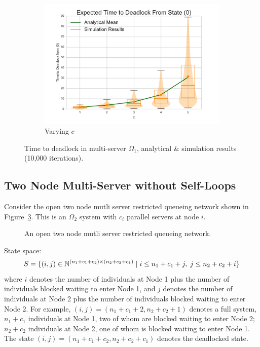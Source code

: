 \documentclass{article}
\begin{document}
\begin{figure}[!htbp]
\begin{center}
\begin{subfigure}[b]{0.35\textwidth}
    \includegraphics[width=\textwidth]{images/varyc_1Nms}
    \caption{Varying $c$}
    \label{fig:1Nms_c}
  \end{subfigure}
  \end{center}
  \caption{Time to deadlock in multi-server $\Omega_1$, analytical \& simulation results (10,000 iterations).}
  \label{fig:timestodeadlock1nodemultiserver}
\end{figure}











\subsection{Two Node Multi-Server without Self-Loops}\label{sec:2nodeMS}

Consider the open two node mutli server restricted queueing network shown in Figure~\ref{fig:queueingnetwork_2nodemulti}.
This is an $\Omega_2$ system with $c_i$ parallel servers at node $i$.

\begin{figure}[!htbp]
  \begin{center}
  
  \end{center}
  \caption{An open two node mutli server restricted queueing network.}
  \label{fig:queueingnetwork_2nodemulti}
\end{figure}

State space:
        \[S = \{(i,j)\in\mathbb{N}^{(n_1+c_1+c_2)\times (n_2+c_2+c_1)} \nonscript\; | \nonscript\; i \leq n_1+c_1+j, \nonscript\; j \leq n_2+c_2+i\}\]
where $i$ denotes the number of individuals at Node 1 plus the number of individuals blocked waiting to enter Node 1, and $j$ denotes the number of individuals at Node 2 plus the number of individuals blocked waiting to enter Node 2.
For example, $(i, j) = (n_1+c_1+2, n_2+c_2+1)$ denotes a full system, $n_1+c_1$ individuals at Node 1, two of whom are blocked waiting to enter Node 2; $n_2+c_2$ individuals at Node 2, one of whom is blocked waiting to enter Node 1.
The state $(i, j) = (n_1+c_1+c_2, n_2+c_2+c_1)$ denotes the deadlocked state.
\end{document}
